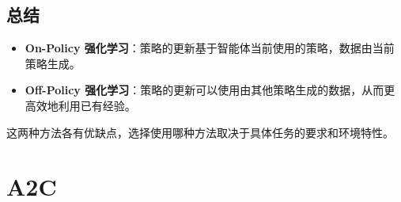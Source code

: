 \documentclass[twocolumn, 10pt]{article} %
\theoremstyle{remark}
\begin{document}
\subsection{总结}

\begin{itemize}
    \item \textbf{On-Policy 强化学习}：策略的更新基于智能体当前使用的策略，数据由当前策略生成。
    \item \textbf{Off-Policy 强化学习}：策略的更新可以使用由其他策略生成的数据，从而更高效地利用已有经验。
\end{itemize}

这两种方法各有优缺点，选择使用哪种方法取决于具体任务的要求和环境特性。

\section{A2C}


\end{document}
